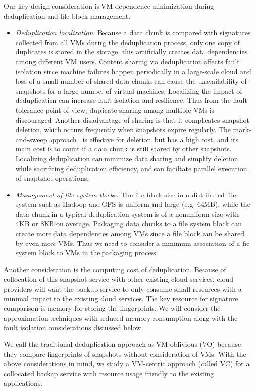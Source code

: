 Our key design consideration is VM dependence minimization during deduplication and file block management.
\begin{itemize}
\item {\em Deduplication localization.}
Because a data chunk is compared with signatures collected from all VMs during
the deduplication process, only one copy of duplicates is stored in the storage,
this artificially creates data dependencies among different VM users. 
Content sharing via deduplication affects fault isolation since machine failures happen periodically 
in a large-scale cloud and
loss of a small number of shared data chunks can 
cause the unavailability of snapshots for a large number of virtual machines.
Localizing the impact of deduplication can increase fault isolation and resilience.
Thus from the fault tolerance point of view,  duplicate sharing among multiple VMs is 
discouraged. 
Another disadvantage of sharing is that it complicates snapshot deletion, 
which  occurs frequently when snapshots expire regularly. 
The mark-and-sweep approach~\cite{Guo2011} is effective for deletion, but has a high cost, and its main cost
is to count if a data chunk is still shared by other snapshots.
Localizing deduplication can  minimize data sharing and simplify deletion while sacrificing 
deduplication efficiency, and  can faciltate parallel execution of snaptshot operations.
\item{\em  Management of file system blocks.}
The file block size in a distributed file system such as  Hadoop and GFS is uniform and large (e.g.  64MB),
while the data chunk in a typical deduplication system is of a nonuniform size with 4KB or 8KB on average.
Packaging data chunks to a file system block can create more data dependencies among VMs
since a file block can be shared by even more VMs.
Thus we need to consider a minimum association of a fie system block to VMs in the packaging process.
\end{itemize}

Another consideration is the computing cost of deduplication.
Because of collocation of this snapshot service with other existing cloud services, 
cloud providers will want the backup service to only consume small resources
with a minimal impact to the existing cloud services.
The key resource for signature comparison  is memory for storing the fingerprints. 
We will consider the approximation techniques with reduced memory consumption along 
with the fault isolation considerations discussed below. 

We call the traditional deduplication approach as   VM-oblivious (VO)
because they compare fingerprints of snapshots without consideration of VMs.
With the above  considerations in mind, we study a 
VM-centric approach (called VC)
for a collocated backup service with resource usage friendly
to the existing applications.  

